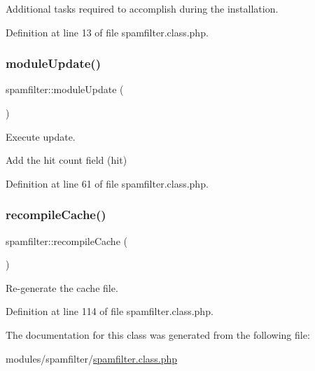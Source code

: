 Additional tasks required to accomplish during the installation. 



Definition at line 13 of file spamfilter.\+class.\+php.

\mbox{\label{classspamfilter_ae3980ae505347671cd20e5de25448772}} 
\subsubsection{\texorpdfstring{module\+Update()}{moduleUpdate()}}
{\footnotesize\ttfamily spamfilter\+::module\+Update (\begin{DoxyParamCaption}{ }\end{DoxyParamCaption})}



Execute update. 

Add the hit count field (hit)

Definition at line 61 of file spamfilter.\+class.\+php.

\mbox{\label{classspamfilter_af660e435ce957c41e79a555110875960}} 
\subsubsection{\texorpdfstring{recompile\+Cache()}{recompileCache()}}
{\footnotesize\ttfamily spamfilter\+::recompile\+Cache (\begin{DoxyParamCaption}{ }\end{DoxyParamCaption})}



Re-\/generate the cache file. 



Definition at line 114 of file spamfilter.\+class.\+php.



The documentation for this class was generated from the following file\+:\begin{DoxyCompactItemize}
\item 
modules/spamfilter/\hyperlink{spamfilter_8class_8php}{spamfilter.\+class.\+php}\end{DoxyCompactItemize}
